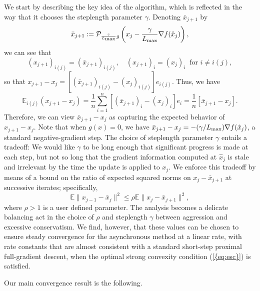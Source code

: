 \documentclass{siamltex}
\begin{document}
We start by describing the key idea of the algorithm, which is
reflected in the way that it chooses the steplength parameter
$\gamma$.  Denoting $\bar{x}_{j+1}$ by
\begin{equation}
\bar{x}_{j+1} :=\mathcal{P}_{{\gamma \over {L_{\mbox{\rm\scriptsize max}}}}g}\left(x_j-{\gamma\over {L_{\mbox{\rm\scriptsize max}}}} \nabla f({\hat{x}}_{j})\right),
\label{eqn_xj1}
\end{equation}
we can see that 
\[
(x_{j+1})_{i(j)} = (\bar{x}_{j+1})_{i(j)}, \quad (x_{j+1})_i = (x_j)_i
\;\; \mbox{for $i \neq i(j)$},
\]
so that $x_{j+1}-x_j = [(\bar{x}_{j+1})_{i(j)} -(x_j)_{i(j)} ] e_{i(j)}$.  Thus, we
have
\[ 
{\mathbb{E}}_{i(j)}(x_{j+1} - x_j) = 
\frac{1}{n} \sum_{i=1}^n [ (\bar{x}_{j+1})_{i} - (x_j)_i ] e_i =
\frac{1}{n} [ \bar{x}_{j+1}-x_j].
\] 
Therefore, we can view $\bar{x}_{j+1}-x_j$ as capturing the expected
behavior of $x_{j+1}-x_j$. Note that when $g(x)=0$, we have
$\bar{x}_{j+1}-x_j=-({\gamma}/{L_{\mbox{\rm\scriptsize max}}})\nabla f({\hat{x}}_j)$, a standard
negative-gradient step. The choice of steplength parameter $\gamma$
entails a tradeoff: We would like $\gamma$ to be long enough that
significant progress is made at each step, but not so long that the
gradient information computed at ${\hat{x}}_j$ is stale and irrelevant by
the time the update is applied to $x_j$. We enforce this tradeoff by
means of a bound on the ratio of expected squared norms on
$x_j-\bar{x}_{j+1}$ at successive iterates; specifically,
\begin{equation} \label{eq:ratio_unc}
{\mathbb{E}}\|x_{j-1}-\bar{x}_j\|^2 \leq \rho {\mathbb{E}}\|x_j - \bar{x}_{j+1}\|^2,
\end{equation}
where $\rho > 1$ is a user defined parameter.  The analysis becomes a
delicate balancing act in the choice of $\rho$ and steplength $\gamma$
between aggression and excessive conservatism. We find, however, that
these values can be chosen to ensure steady convergence for the
asynchronous method at a linear rate, with rate constants that are
almost consistent with a standard short-step proximal full-gradient
descent, when the optimal strong convexity condition {(\ref{{eq:esc}})} is
satisfied.

Our main convergence result is the following.
\end{document}
